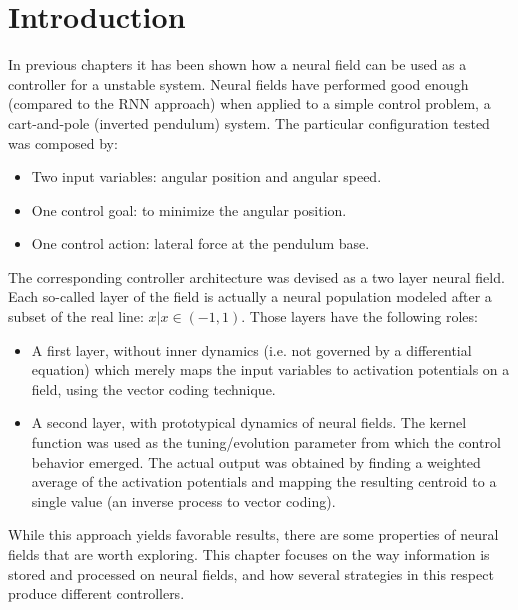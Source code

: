 \section{Introduction}
\label{sec:chp3-introduction}
In previous chapters it has been shown how a neural field can be used
as a controller for a unstable system. Neural fields have performed
good enough (compared to the RNN approach) when applied to a simple
control problem, a cart-and-pole (inverted pendulum) system. The
particular configuration tested was composed by:

\begin{itemize}
\item Two input variables: angular position and angular speed.
\item One control goal: to minimize the angular position.
\item One control action: lateral force at the pendulum base.
\end{itemize}

The corresponding controller architecture was devised as a two layer
neural field. Each so-called layer of the field is actually a neural
population modeled after a subset of the real line: $x | x \in
(-1,1)$. 
Those layers have the following roles:

\begin{itemize}
\item A first layer, without inner dynamics (i.e. not governed by a
  differential equation) which merely maps the input variables to
  activation potentials on a field, using the vector coding technique.
\item A second layer, with prototypical dynamics of neural fields. The
  kernel function was used as the tuning/evolution parameter from
  which the control behavior emerged. The actual output was obtained
  by finding a weighted average of the activation potentials and
  mapping the resulting centroid to a single value (an inverse process
  to vector coding).
\end{itemize}

While this approach yields favorable results, there are some
properties of neural fields that are worth exploring. This chapter
focuses on the way information is stored and processed on neural
fields, and how several strategies in this respect produce different
controllers.

